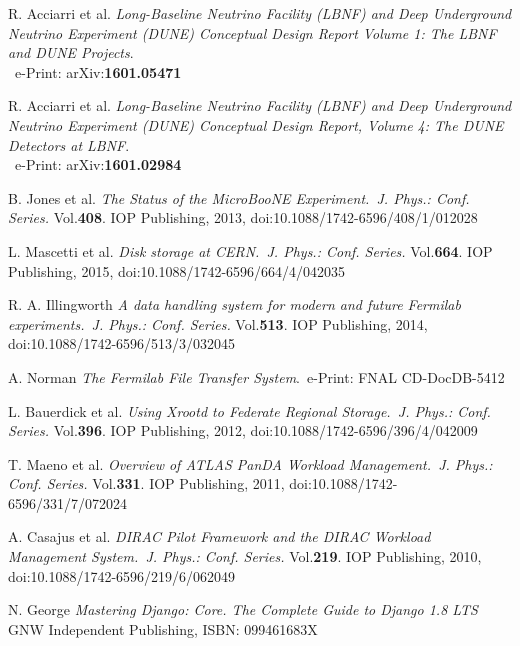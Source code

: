 \documentclass{PoS}
\begin{document}
\begin{thebibliography}{99}



R. Acciarri et al.
\emph{Long-Baseline Neutrino Facility (LBNF) and Deep Underground Neutrino Experiment (DUNE) Conceptual Design Report Volume 1: The LBNF and DUNE Projects}.\\ ~e-Print: arXiv:\textbf{1601.05471}

R. Acciarri et al.
\emph{Long-Baseline Neutrino Facility (LBNF) and Deep Underground Neutrino Experiment (DUNE) Conceptual Design Report, Volume 4: The DUNE Detectors at LBNF}.\\~e-Print: arXiv:\textbf{1601.02984}


B. Jones et al.  \emph{The Status of the MicroBooNE Experiment.~J. Phys.: Conf. Series.} Vol.\textbf{408}. IOP Publishing, 2013,
doi:10.1088/1742-6596/408/1/012028

 L. Mascetti et al. \emph{Disk storage at CERN.~J. Phys.: Conf. Series.} Vol.\textbf{664}. IOP Publishing, 2015,
doi:10.1088/1742-6596/664/4/042035


R. A. Illingworth \emph{A data handling system for modern and future Fermilab experiments.~J. Phys.: Conf. Series.} Vol.\textbf{513}. IOP Publishing, 2014,
doi:10.1088/1742-6596/513/3/032045

A. Norman \emph{The Fermilab File Transfer System}.~e-Print: FNAL CD-DocDB-5412


L. Bauerdick et al. \emph{Using Xrootd to Federate Regional Storage.~J. Phys.: Conf. Series.} Vol.\textbf{396}. IOP Publishing, 2012,
doi:10.1088/1742-6596/396/4/042009

T. Maeno et al. \emph{Overview of ATLAS PanDA Workload Management.~J. Phys.: Conf. Series.} Vol.\textbf{331}. IOP Publishing, 2011,
doi:10.1088/1742-6596/331/7/072024



A. Casajus et al.  \emph{DIRAC Pilot Framework and the DIRAC
Workload Management System.~J. Phys.: Conf. Series.} Vol.\textbf{219}. IOP Publishing, 2010,
doi:10.1088/1742-6596/219/6/062049

N. George \emph{Mastering Django: Core. The Complete Guide to Django 1.8 LTS}~ GNW Independent Publishing, ISBN: 099461683X



\end{thebibliography}
\end{document}
